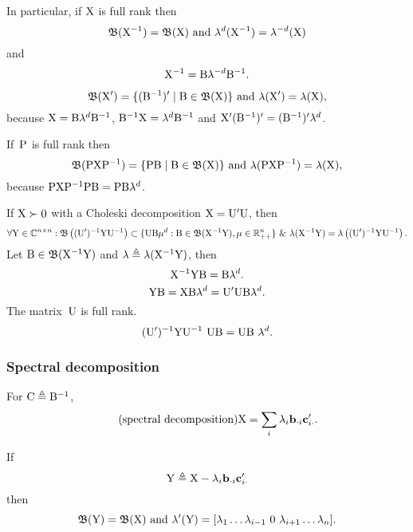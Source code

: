 \documentclass[10pt,a4paper]{article}
\theoremstyle{plain} \newtheorem{Lem}{Lemma}
\begin{document}
\bigskip
In particular, if $\mathrm X$ is full rank then
$$\mathfrak B(\mathrm X^{-1}) = \mathfrak B(\mathrm X) \text{ and } \mathbf \lambda^d(\mathrm X^{-1}) = \mathbf \lambda^{-d} (\mathrm X) $$
and
$$ \mathrm X^{-1} = \mathrm B \mathbf \lambda^{-d} \mathrm B^{-1}. $$

\bigskip
$$ \mathfrak B(\mathrm X') = \{(\mathrm B^{-1})' \mid \mathrm B \in \mathfrak B(\mathrm X)\} \text{ and } \mathbf \lambda(\mathrm X') = \mathbf \lambda(\mathrm X), $$
because
$\mathrm X = \mathrm B \mathbf \lambda^d \mathrm B^{-1}$,
$\mathrm B^{-1} \mathrm X = \mathbf \lambda^d \mathrm B^{-1}$
and
$\mathrm X' (\mathrm B^{-1})' = (\mathrm B^{-1})' \mathbf \lambda^d$.

\bigskip
If~$\mathrm P$ is full rank then
$$ \mathfrak B(\mathrm P \mathrm X \mathrm P^{-1}) = \{\mathrm P \mathrm B \mid \mathrm B \in \mathfrak B(\mathrm X)\} \text{ and } \mathbf \lambda(\mathrm P \mathrm X \mathrm P^{-1}) = \mathbf \lambda(\mathrm X), $$
because $\mathrm P \mathrm X \mathrm P^{-1} \mathrm P \mathrm B = \mathrm P \mathrm B \mathbf \lambda^d$.

\bigskip
If $\mathrm X \succ 0$ with a Choleski decomposition $\mathrm X = \mathrm U' \mathrm U$,
then
\begin{equation} \label{eigenPdY}
  \forall \mathrm Y \in \mathbb C^{n \times n} :
    \mathfrak B \left((\mathrm U')^{-1} \mathrm Y \mathrm U^{-1} \right) \subset \{\mathrm U \mathrm B \mathbf \mu^d: \mathrm B \in \mathfrak B(\mathrm X^{-1} \mathrm Y), \mathbf \mu \in \mathbb R_{++}^n\}
    \ \& \  \mathbf \lambda(\mathrm X^{-1} \mathrm Y) = \mathbf \lambda \left( (\mathrm U')^{-1} \mathrm Y \mathrm U^{-1} \right).
\end{equation}
\proof
{
Let $\mathrm B \in \mathfrak B(\mathrm X^{-1} \mathrm Y)$ and $\mathbf \lambda \triangleq \mathbf \lambda(\mathrm X^{-1} \mathrm Y)$,
then
$$ \mathrm X^{-1} \mathrm Y \mathrm B = \mathrm B \mathbf \lambda^d. $$
$$ \mathrm Y \mathrm B = \mathrm X \mathrm B \mathbf \lambda^d = \mathrm U' \mathrm U \mathrm B \mathbf \lambda^d. $$
The matrix~$\mathrm U$ is full rank.
$$ (\mathrm U')^{-1} \mathrm Y \mathrm U^{-1} \ \mathrm U \mathrm B = \mathrm U \mathrm B \ \mathbf \lambda^d. $$
}

\subsubsection {Spectral decomposition}
For $\mathrm C \triangleq \mathrm B^{-1}$,
\begin{equation*} \tag{spectral decomposition}
\mathrm X = \sum_i \lambda_i \mathbf b_{\cdot i} \mathbf c_{i \cdot}'.
\end{equation*}

If
$$\mathrm Y \triangleq \mathrm X - \lambda_i \mathbf b_{\cdot i} \mathbf c_{i \cdot}'$$
then
$$ \mathfrak B(\mat Y) = \mathfrak B(\mat X) \text{ and } \ve \lambda'(\mat Y) = [\lambda_1 \dots \lambda_{i-1} \ 0 \ \lambda_{i+1} \dots \lambda_n]. $$
\end{document}

